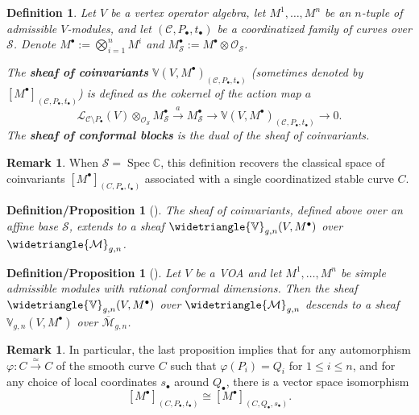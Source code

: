 \documentclass[12pt,a4paper,reqno]{amsart}
\numberwithin{equation}{section}
\newtheorem{defproposition}[theorem]{Definition/Proposition}
\newtheorem{definition}[theorem]{Definition}
\theoremstyle{definition}
\newtheorem{remark}[theorem]{Remark}
\renewcommand{\S}{\mathcal{S}}
\newcommand{\M}{\mathcal{M}}
\newcommand{\CCC}{\mathscr{C}}
\def\O{\mathcal{O}}
\def\VV{\mathbb{V}}
\begin{document}
\begin{definition}
     Let $V$ be a vertex operator algebra, let $M^1,\dots, M^n$ be an $n$-tuple of admissible $V$-modules, and let $(\mathscr{C}, P_\bullet, t_\bullet)$ be a coordinatized family of curves over $\S$. Denote $M^\bullet := \bigotimes_{i=1}^n M^i$ and $M^\bullet_\S:=M^\bullet \otimes \O_\S$.

     The \textbf{sheaf of coinvariants} $\VV(V,M^\bullet)_{(\CCC,P_\bullet,t_\bullet)}$ (sometimes denoted by $[M^\bullet]_{(\mathscr{C},P_\bullet,t_\bullet)}$) is defined as the cokernel of the action map $a$
\begin{equation}
    \mathcal{L}_{\mathscr{C} \setminus P_\bullet}(V) \otimes_{\O_{\mathcal{S}}} M^\bullet_\S \stackrel{a}{\longrightarrow} M^\bullet_\S \longrightarrow \VV(V,M^\bullet)_{(\mathscr{C},P_\bullet,t_\bullet)} \longrightarrow 0.
\end{equation}
    The \textbf{sheaf of conformal blocks} is the dual of the sheaf of coinvariants.
\end{definition}
\begin{remark}
    When $\mathcal{S} = \operatorname{Spec} \mathbb{C}$, this definition recovers the classical space of coinvariants $[M^\bullet]_{(C, P_\bullet, t_\bullet)}$ associated with a single coordinatized stable curve $C$.
\end{remark}
\begin{defproposition}[{\cite[Section 5.2]{DGT1}}]
    The sheaf of coinvariants, defined above over an affine base $\S$, extends to a sheaf $\widetriangle{\VV}_{g,n}(V,M^\bullet)$ over $\widetriangle{\M}_{g,n}$.
\end{defproposition}
\begin{defproposition}[{\cite[Section 8.7]{DGT2}}]\label{prop:isocoinvfiber}
    Let $V$ be a VOA and let $M^1,\dots,M^n$ be simple admissible modules with rational conformal dimensions. Then the sheaf $\widetriangle{\VV}_{g,n}(V,M^\bullet)$ over $\widetriangle{\M}_{g,n}$ descends to a sheaf $\VV_{g,n}(V,M^\bullet)$ over $\overline{\M}_{g,n}$.
\end{defproposition}
\begin{remark}\label{remark:coordinatefree}
    In particular, the last proposition implies that for any automorphism $\varphi: C\xrightarrow{\simeq} C$ of the smooth curve $C$ such that $\varphi(P_i)=Q_i$ for $1\leq i\leq n$, and for any choice of local coordinates $s_\bullet$ around $Q_\bullet$, there is a vector space isomorphism
\[
[M^\bullet]_{(C,P_\bullet,t_\bullet)}\cong [M^\bullet]_{(C,Q_\bullet,s_\bullet)}.
\]
\end{remark}
\end{document}
